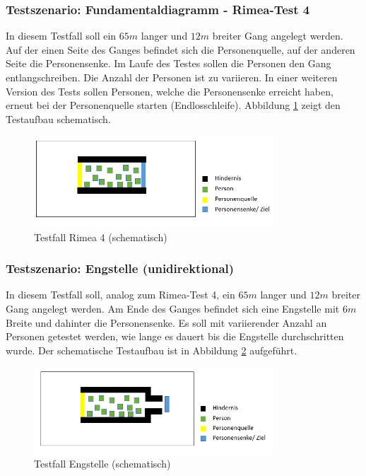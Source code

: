 \subsubsection{Testszenario: Fundamentaldiagramm - Rimea-Test 4}
\label{Anforderungen:RimeaTest}
In diesem Testfall soll ein $65m$ langer und $12m$ breiter Gang angelegt werden. Auf der einen Seite des Ganges befindet sich die Personenquelle, auf der anderen Seite die Personensenke. Im Laufe des Testes sollen die Personen den Gang entlangschreiben. Die Anzahl der Personen ist zu variieren. In einer weiteren Version des Tests sollen Personen, welche die Personensenke erreicht haben, erneut bei der Personenquelle starten (Endlosschleife). Abbildung \ref{fig:Test_Rimea4} zeigt den Testaufbau schematisch.

\begin{figure}[htpb]
	\centering
	\includegraphics[width=0.8\textwidth]{abbildungen/Test_Rimea4-2.png}
	\caption{Testfall Rimea 4 (schematisch)}
	\label{fig:Test_Rimea4}
\end{figure}

\subsubsection{Testszenario: Engstelle (unidirektional)}
In diesem Testfall soll, analog zum Rimea-Test 4, ein $65m$ langer und $12m$ breiter Gang angelegt werden. Am Ende des Ganges befindet sich eine Engstelle mit $6m$ Breite und dahinter die Personensenke. Es soll mit variierender Anzahl an Personen getestet werden, wie lange es dauert bis die Engstelle durchschritten wurde. Der schematische Testaufbau ist in Abbildung \ref{fig:Engstelle} aufgeführt.

\begin{figure}[htpb]
	\centering
	\includegraphics[width=0.8\textwidth]{abbildungen/Test_Engstelle.png}
	\caption{Testfall Engstelle (schematisch)}
	\label{fig:Engstelle}
\end{figure}

